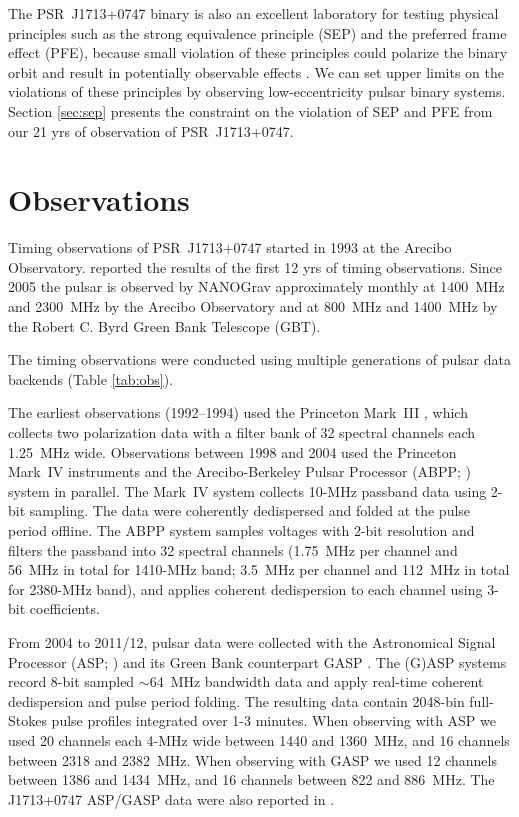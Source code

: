 The PSR~J1713+0747 binary is also an excellent laboratory for testing physical 
principles such as the strong equivalence principle (SEP) and the preferred
frame effect (PFE), because small violation of these principles could polarize the
binary orbit and result in potentially observable effects \citep{will14}. We can set
upper limits on the violations of these principles by observing
low-eccentricity pulsar binary systems. Section \ref{sec:sep} presents the
constraint on the violation of SEP and PFE from our 21 yrs of observation of PSR~J1713+0747.

\section{Observations}
Timing observations of PSR~J1713+0747 started in 1993 at the Arecibo
Observatory. \citet{sns+05} reported the results of the first 12 yrs
of timing observations. Since 2005 the pulsar is observed by NANOGrav approximately monthly
at 1400~MHz and 2300~MHz by the Arecibo
Observatory and at 800~MHz and 1400~MHz by the Robert C. Byrd Green Bank
Telescope (GBT).

The timing observations were conducted using multiple generations of pulsar
data backends (Table \ref{tab:obs}).

The earliest observations (1992--1994) used the Princeton Mark~III
\citep{skn+92}, which collects two polarization data with a filter bank of 32
spectral channels each 1.25~MHz wide. 
Observations between 1998 and 2004 used the Princeton Mark~IV
\citep{sst+00} instruments and the Arecibo-Berkeley Pulsar Processor
(ABPP; \citealt{bdz+97}) system  in parallel. 
The Mark~IV system collects 10-MHz passband data using 2-bit sampling. The
data were coherently dedispersed and folded at the pulse period offline.
The ABPP system samples voltages with 2-bit resolution and filters the passband 
into 32 spectral channels (1.75~MHz
per channel and 56~MHz in total for 1410-MHz band; 3.5~MHz per channel and 
112~MHz in total for 2380-MHz band), and applies coherent dedispersion to each
channel using 3-bit coefficients. 

From 2004 to 2011/12, pulsar data were collected with the Astronomical Signal
Processor (ASP; \citealt{dem07}) and its Green Bank counterpart GASP \citep{dem07}.
The (G)ASP systems record 8-bit sampled $\sim$64~MHz bandwidth data and apply real-time
coherent dedispersion and pulse period folding. The resulting data contain
2048-bin full-Stokes pulse profiles integrated over 1-3 minutes. 
When observing with ASP we used 20 channels each 4-MHz wide between 1440 and
1360~MHz, and 16 channels between 2318 and 2382~MHz. 
When observing with GASP we used 12 channels between 1386 and 1434~MHz, and 16
channels between 822 and 886~MHz.
The J1713+0747 ASP/GASP data were also reported in \citet{dfg+13}.

